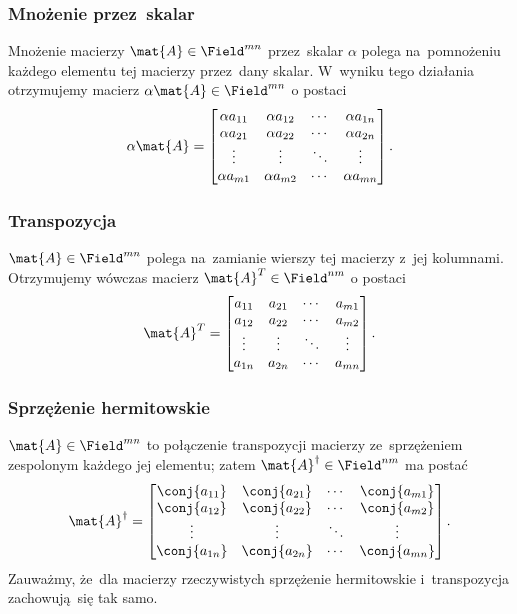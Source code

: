 \subsubsection{Mnożenie przez~skalar}
Mnożenie macierzy $\mat{A} \in \Field^{mn}$ przez~skalar $\alpha$ polega
na~pomnożeniu każdego elementu tej macierzy przez~dany skalar. W~wyniku tego
działania otrzymujemy macierz $\alpha\mat{A} \in \Field^{mn}$ o postaci
$$
	\alpha \mat{A} =
	\begin{bmatrix}
		\alpha a_{11} & \alpha a_{12} & \cdots & \alpha a_{1n} \\
		\alpha a_{21} & \alpha a_{22} & \cdots & \alpha a_{2n} \\
		\vdots        & \vdots        & \ddots & \vdots        \\
		\alpha a_{m1} & \alpha a_{m2} & \cdots & \alpha a_{mn}
	\end{bmatrix}.
$$

\subsubsection{Transpozycja}
 $\mat{A} \in
	\Field^{mn}$ polega na~zamianie wierszy tej
macierzy z~jej kolumnami. Otrzymujemy wówczas macierz $\mat{A}^T \in
	\Field^{nm}$ o postaci
$$\mat{A}^T =
	\begin{bmatrix}
		a_{11} & a_{21} & \cdots & a_{m1} \\
		a_{12} & a_{22} & \cdots & a_{m2} \\
		\vdots & \vdots & \ddots & \vdots \\
		a_{1n} & a_{2n} & \cdots & a_{mn}
	\end{bmatrix}.
$$


\subsubsection{Sprzężenie hermitowskie}
 $\mat{A} \in \Field^{mn}$ to połączenie
transpozycji macierzy ze~sprzężeniem zespolonym każdego jej elementu; zatem
$\mat{A}^\dagger \in \Field^{nm}$ ma postać
$$
	\mat{A}^\dagger =
	\begin{bmatrix}
		\conj{a_{11}} & \conj{a_{21}} & \cdots & \conj{a_{m1}} \\
		\conj{a_{12}} & \conj{a_{22}} & \cdots & \conj{a_{m2}} \\
		\vdots        & \vdots        & \ddots & \vdots        \\
		\conj{a_{1n}} & \conj{a_{2n}} & \cdots & \conj{a_{mn}}
	\end{bmatrix}.
$$
Zauważmy, że~dla macierzy rzeczywistych sprzężenie hermitowskie i~transpozycja zachowują~się tak samo.

